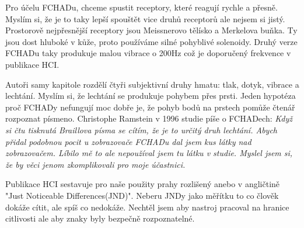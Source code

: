 Pro účelu FCHADu, chceme spustit receptory, které reagují rychle a přesně.  Myslím si, že je to taky lepší spouštět vice druhů receptorů ale nejsem si jistý.  Prostorově nejpřesnější receptory jsou Meissnerovo tělísko a Merkelova buňka.  Ty jsou dost hluboké v kůže, proto používáme silné pohyblivé solenoidy.  Druhý verze FCHADu taky produkuje malou vibrace o 200Hz což je doporučený frekvence v publikace HCI\citep[str. 29-30]{nielsen2008gesture}.

Autoři samy kapitole rozdělí čtyři subjektivní druhy hmatu: tlak, dotyk, vibrace a lechtání.  Myslím si, že lechtání se produkuje pohybem přes prsti.  Jeden hypotéza proč FCHADy nefungují moc dobře je, že pohyb bodů na prstech pomůže čtenář rozpoznat písmeno.  Christophe Ramstein v 1996 studie píše o FCHADech: \em {} \em \citep[str. 38, přeložený z angličtiny]{ramstein1996combining}
Když si čtu tisknutá Braillova písma se cítím, že je to určitý druh lechtání.  Abych přidal podobnou pocit u zobrazovače FCHADu dal jsem kus látky nad zobrazovačem.  Líbilo mě to ale nepoužíval jsem tu látku v studie. Myslel jsem si, že by věci jenom zkomplikovali pro moje účastnici.

Publikace HCI sestavuje pro naše použity prahy rozlišený anebo v angličtině "Just Noticeable Differences(JND)". Neberu JNDy jako měřítku to co člověk dokáže cítit, ale spíš co nedokáže.  Nechtěl jsem aby nastroj pracoval na hranice citlivosti ale aby znaky byly bezpečně rozpoznatelné.

